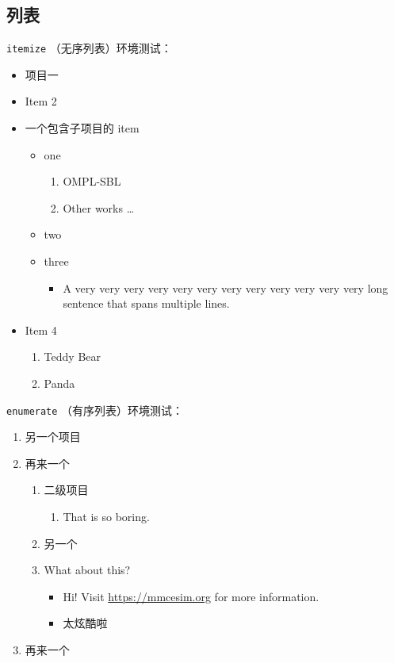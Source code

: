 \subsection{列表}
\texttt{itemize} （无序列表）环境测试：
\begin{itemize}
  \item 项目一
  \item Item 2
  \item 一个包含子项目的 item
  \begin{itemize}
    \item one
    \begin{enumerate}
      \item OMPL-SBL\cite{zhao2023ompl}
      \item Other works \dots
    \end{enumerate}
    \item two
    \item three
    \begin{itemize}
      \item A very very very very very very very very very very very very long sentence that spans multiple lines.
    \end{itemize}
  \end{itemize}
  \item Item 4
  \begin{enumerate}
    \item Teddy Bear
    \item Panda
  \end{enumerate}
\end{itemize}

\texttt{enumerate} （有序列表）环境测试：
\begin{enumerate}
  \item 另一个项目
  \item 再来一个
  \begin{enumerate}
    \item 二级项目
    \begin{enumerate}
      \item That is so boring.
    \end{enumerate}
    \item 另一个
    \item What about this?
    \begin{itemize}
      \item Hi! Visit \url{https://mmcesim.org} for more information.
      \item 太炫酷啦
    \end{itemize}
  \end{enumerate}
  \item 再来一个
\end{enumerate}

